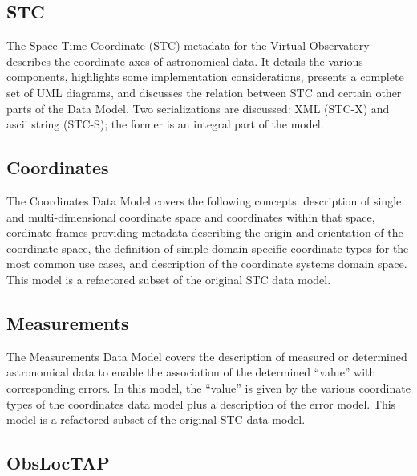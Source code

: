 \documentclass[11pt,letter]{ivoa}
\begin{document}
\subsection{STC}

The Space-Time Coordinate (STC) \citep{2007ivoa.spec.1030R} metadata for
the Virtual Observatory describes the coordinate
axes of astronomical data. It details the various components, highlights
some implementation
considerations, presents a complete set of UML diagrams, and discusses
the relation between
STC and certain other parts of the Data Model. Two serializations are
discussed: XML (STC-X) and
ascii string (STC-S); the former is an integral part of the model.

\subsection{Coordinates}

The Coordinates Data Model \citep{2022ivoa.specQ1004R} 
covers the following concepts: description of single and
multi-dimensional
coordinate space and coordinates within that space, cordinate frames
providing metadata describing the
origin and orientation of the coordinate space, the definition of simple
domain-specific coordinate
types for the most common use cases, and description of the coordinate
systems domain space. This
model is a refactored subset of the original STC data model.

\subsection{Measurements}

The Measurements Data Model \citep{2022ivoa.spec.1004R} 
covers the description of measured or determined astronomical data 
to enable the association of the determined ``value'' with corresponding
errors. In this model,
the ``value'' is given by the various coordinate types of the
coordinates data model plus a
description of the error model. This model is a refactored subset of the
original STC data model.

\subsection{ObsLocTAP} 
\end{document}
